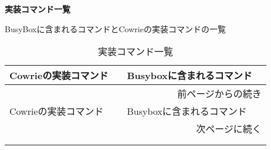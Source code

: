  
\begin{center}
\large{\textbf{実装コマンド一覧}}
\end{center}

BusyBoxに含まれるコマンドとCowrieの実装コマンドの一覧
 
\begin{longtable}{llp{64mm}}
  \caption{実装コマンド一覧}
  \label{table:command} \\
  \hline
  Cowrieの実装コマンド　& Busyboxに含まれるコマンド \\ \hline\hline
  \endfirsthead
  \multicolumn{3}{r}{前ページからの続き} \\ \hline
  Cowrieの実装コマンド　& Busyboxに含まれるコマンド \\ \hline\hline
  \endhead
  \hline
  \multicolumn{3}{r}{次ページに続く} \\
  \endfoot
  \hline
  \multicolumn{3}{r}{以上} \\
  \endlastfoot


\end{longtable}
